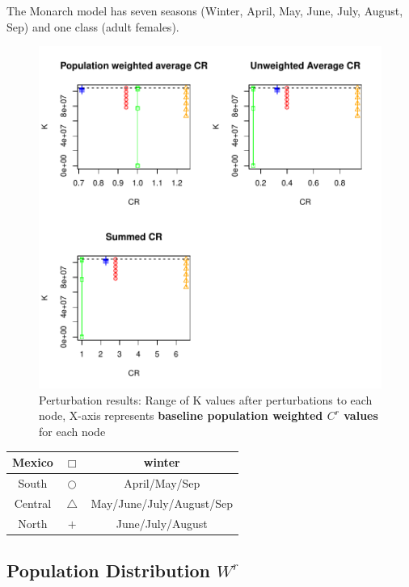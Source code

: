 \documentclass[10pt]{article}
\begin{document}
The Monarch model has seven seasons (Winter, April, May, June, July, August, Sep) and one class (adult females).


\vspace{-.5cm}
\begin{figure}[H]
\begin{center}
\includegraphics[width=.8\textwidth, height=.8\textwidth]{RGraphics-monarch_barcr_averageCR}
\caption{Perturbation results: Range of K values after perturbations to each node, X-axis represents {\bf{baseline population weighted $C^r$ values}} for each node}\label{fig:monarch_barcr_averageCR}
\end{center}
\end{figure}

\vspace{-.5cm}
\begin{tabular}{|c|c|c|}
\hline
{\color{red} Mexico} & $\Box$ & winter \\
\hline
{\color{orange} South} & $\bigcirc$ & April/May/Sep \\
\hline
{\color{blue} Central} & $\triangle$ &  May/June/July/August/Sep \\
\hline
{\color{green} North} & $+$ & June/July/August \\
\hline
\end{tabular}








\newpage
\subsection{Population Distribution \texorpdfstring{$W^r$}{WR}}
\end{document}
